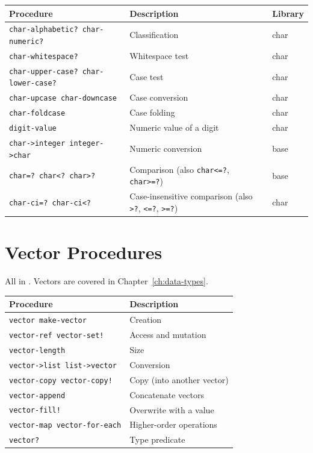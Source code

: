 \begin{center}
\small
\begin{tabularx}{\textwidth}{@{}lYl@{}}
\textbf{Procedure} & \textbf{Description} & \textbf{Library} \\
\hline
\texttt{char-alphabetic? char-numeric?} & Classification & char \\
\texttt{char-whitespace?} & Whitespace test & char \\
\texttt{char-upper-case? char-lower-case?} & Case test & char \\
\texttt{char-upcase char-downcase} & Case conversion & char \\
\texttt{char-foldcase} & Case folding & char \\
\texttt{digit-value} & Numeric value of a digit & char \\
\texttt{char->integer integer->char} & Numeric conversion & base \\
\texttt{char=? char<? char>?} & Comparison (also \texttt{char<=?}, \texttt{char>=?}) & base \\
\texttt{char-ci=? char-ci<?} & Case-insensitive comparison (also \texttt{>?}, \texttt{<=?}, \texttt{>=?}) & char \\
\end{tabularx}
\end{center}

\section{Vector Procedures}

All in . Vectors are covered in Chapter~\ref{ch:data-types}.

\begin{center}
\small
\begin{tabularx}{\textwidth}{@{}lY@{}}
\textbf{Procedure} & \textbf{Description} \\
\hline
\texttt{vector make-vector} & Creation \\
\texttt{vector-ref vector-set!} & Access and mutation \\
\texttt{vector-length} & Size \\
\texttt{vector->list list->vector} & Conversion \\
\texttt{vector-copy vector-copy!} & Copy (into another vector) \\
\texttt{vector-append} & Concatenate vectors \\
\texttt{vector-fill!} & Overwrite with a value \\
\texttt{vector-map vector-for-each} & Higher-order operations \\
\texttt{vector?} & Type predicate \\
\end{tabularx}
\end{center}

